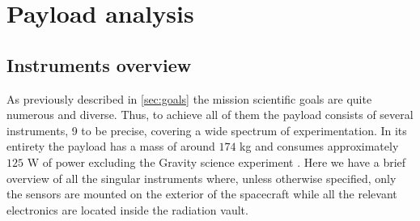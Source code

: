 \section{Payload analysis}
\label{sec:payload}

\subsection{Instruments overview}
As previously described in \autoref{sec:goals} the mission scientific goals are quite numerous and diverse. Thus, to achieve all of them the payload consists of several instruments, 9 to be precise, covering a wide spectrum of experimentation. In its entirety the payload has a mass of around $174$ kg and consumes approximately $125$ W of power excluding the Gravity science experiment \cite{Key_requirements}.
Here we have a brief overview of all the singular instruments where, unless otherwise specified, only the sensors are mounted on the exterior of the spacecraft while all the relevant electronics are located inside the radiation vault. 

